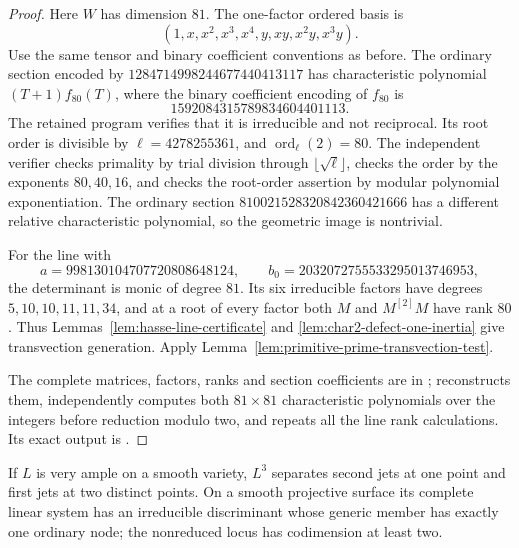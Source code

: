 \begin{proof}
Here $W$ has dimension $81$.  The one-factor ordered basis is
\[
                 (1,x,x^2,x^3,x^4,y,xy,x^2y,x^3y).
\]
Use the same tensor and binary coefficient conventions as before.
The ordinary section encoded by $1284714998244677440413117$
has characteristic polynomial $(T+1)f_{80}(T)$, where the binary
coefficient encoding of $f_{80}$ is
\[
                         1592084315789834604401113.
\]
The retained program verifies that it is irreducible and not
reciprocal.  Its root order is divisible by
$\ell=4278255361$, and
$\operatorname{ord}_{\ell}(2)=80$.
The independent verifier checks primality by trial division
through $\lfloor\sqrt\ell\rfloor$, checks the order by the
exponents $80,40,16$, and checks the root-order assertion by
modular polynomial exponentiation.  The ordinary section
$810021528320842360421666$ has a different relative characteristic
polynomial, so the geometric image is nontrivial.

For the line with
\[
 a=998130104707720808648124,
 \qquad b_0=2032072755533295013746953,
\]
the determinant is monic of degree $81$.  Its six irreducible
factors have degrees $5,10,10,11,11,34$, and at a root of every
factor both $M$ and $M^{[2]}M$ have rank $80$.
Thus Lemmas~\ref{lem:hasse-line-certificate} and
\ref{lem:char2-defect-one-inertia} give transvection generation.
Apply Lemma~\ref{lem:primitive-prime-transvection-test}.

The complete matrices, factors, ranks and section coefficients
are in ;
 reconstructs them, independently
computes both $81\times81$ characteristic polynomials over the
integers before reduction modulo two, and repeats all the line
rank calculations.  Its exact output is
.
\end{proof}

\begin{lemma}
\label{lem:cubic-power-jets}
If $L$ is very ample on a smooth variety, $L^3$ separates second
jets at one point and first jets at two distinct points.
On a smooth projective surface its complete linear system has an irreducible
discriminant whose generic member has exactly one ordinary node;
the nonreduced locus has codimension at least two.
\end{lemma}

